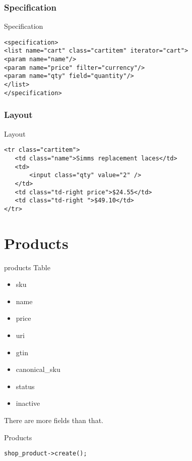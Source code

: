 \subsubsection{Specification}
\begin{frame}[fragile]{Specification}
\begin{lstlisting}
<specification>
<list name="cart" class="cartitem" iterator="cart">
<param name="name"/>
<param name="price" filter="currency"/>
<param name="qty" field="quantity"/>
</list>
</specification>
\end{lstlisting}
\end{frame}

\subsubsection{Layout}
\begin{frame}[fragile]{Layout}
\begin{lstlisting}
<tr class="cartitem">
   <td class="name">Simms replacement laces</td>
   <td>
       <input class="qty" value="2" />
   </td>
   <td class="td-right price">$24.55</td>
   <td class="td-right ">$49.10</td>
</tr>
\end{lstlisting}
\end{frame}

\section{Products}
\begin{frame}[fragile]{products Table}
\begin{itemize}
\item sku
\item name
\item price
\item uri
\item gtin
\item canonical\_sku
\item status
\item inactive
\end{itemize}
\end{frame}

There are more fields than that.

\begin{frame}[fragile]{Products}
\begin{lstlisting}
shop_product->create();
\end{lstlisting}
\end{frame}


